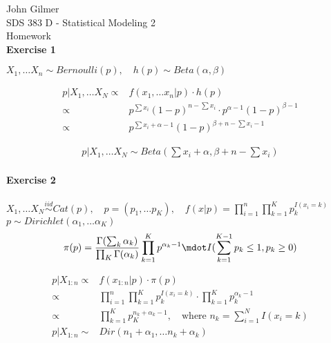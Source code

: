 \documentclass[11pt]{article}
\begin{document}
    \noindent John Gilmer \\
    \noindent SDS 383 D - Statistical Modeling 2 \\
    \noindent Homework \\

    \noindent\textbf{Exercise 1}

    \(X_1, \dots X_n \sim Bernoulli(p), \quad h(p) \sim Beta(\alpha, \beta)\)

    \begin{align*}
        p | X_1, \dots X_N \propto& f(x_1, \dots x_n |p) \cdot h(p) \\
        \propto&  p^{\sum x_i} (1 - p)^{n- \sum x_i} \cdot p^{\alpha - 1} (1 - p) ^{\beta - 1} \\
        \propto&  p^{\sum x_i + \alpha - 1} (1 - p)^{\beta + n - \sum x_i - 1}
    \end{align*}

    \begin{align*}
      p | X_1, \dots X_N \sim Beta(\sum x_i + \alpha, \beta + n - \sum x_i)
    \end{align*}
    \\

    \noindent\textbf{Exercise 2} \\ \\
    \(X_1, \dots X_N \stackrel{iid}{\sim} Cat(p), \quad p = (p_1, \dots p_K), \quad
       f(x | p) = \prod_{i=1}^{n} \prod_{k=1}^{K} p_k ^{I(x_i = k)}\) \\
    \( p \sim Dirichlet(\alpha_1, \dots \alpha_K)\) \\
    \begin{equation*}
    \pi(p) = \frac{\Gamma (\sum_k \alpha_k)}{\prod_K \Gamma(\alpha_k)} \prod_{k=1}^{K}
        p^{\alpha_k - 1} \mdot I(\sum_{k=1}^{K-1} p_k \leq 1, p_k \geq 0)
    \end{equation*}

    \begin{align*}
        p | X_{1:n} \propto& f(x_{1:n} | p) \cdot \pi(p) \\
        \propto& \prod_{i=1} ^{n} \prod_{k=1}^K p_k ^{I(x_i = k)} \cdot \prod_{k=1}^{K} p_k^{\alpha_k -1} \\
        \propto & \prod_{k=1}^K p_K ^{n_k + \alpha_k -1}, \quad \text{where }n_k = \sum_{i=1}^{N} I(x_i = k) \\
        p | X_{1:n} \sim& Dir(n_1 + \alpha_1, \dots n_k + \alpha_k)
    \end{align*}
\end{document}
